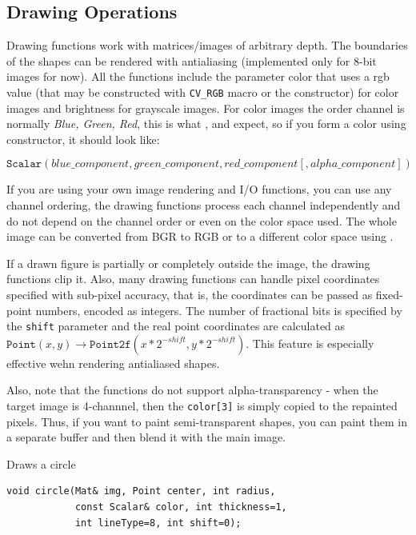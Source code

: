 \subsection{Drawing Operations}

Drawing functions work with matrices/images of arbitrary depth.
The boundaries of the shapes can be rendered with antialiasing (implemented only for 8-bit images for now).
All the functions include the parameter color that uses a rgb value (that may be constructed
with \texttt{CV\_RGB} macro or the  constructor) for color
images and brightness for grayscale images. For color images the order channel
is normally \emph{Blue, Green, Red}, this is what ,  and  expect,
so if you form a color using  constructor, it should look like:

\[\texttt{Scalar}(blue\_component, green\_component, red\_component[, alpha\_component])\]

If you are using your own image rendering and I/O functions, you can use any channel ordering, the drawing functions process each channel independently and do not depend on the channel order or even on the color space used. The whole image can be converted from BGR to RGB or to a different color space using .

If a drawn figure is partially or completely outside the image, the drawing functions clip it. Also, many drawing functions can handle pixel coordinates specified with sub-pixel accuracy, that is, the coordinates can be passed as fixed-point numbers, encoded as integers. The number of fractional bits is specified by the \texttt{shift} parameter and the real point coordinates are calculated as $\texttt{Point}(x,y)\rightarrow\texttt{Point2f}(x*2^{-shift},y*2^{-shift})$. This feature is especially effective wehn rendering antialiased shapes.

Also, note that the functions do not support alpha-transparency - when the target image is 4-channnel, then the \texttt{color[3]} is simply copied to the repainted pixels. Thus, if you want to paint semi-transparent shapes, you can paint them in a separate buffer and then blend it with the main image.

\label{circle}
Draws a circle

\begin{lstlisting}
void circle(Mat& img, Point center, int radius,
            const Scalar& color, int thickness=1,
            int lineType=8, int shift=0);
\end{lstlisting}
\begin{description}
\end{description}

